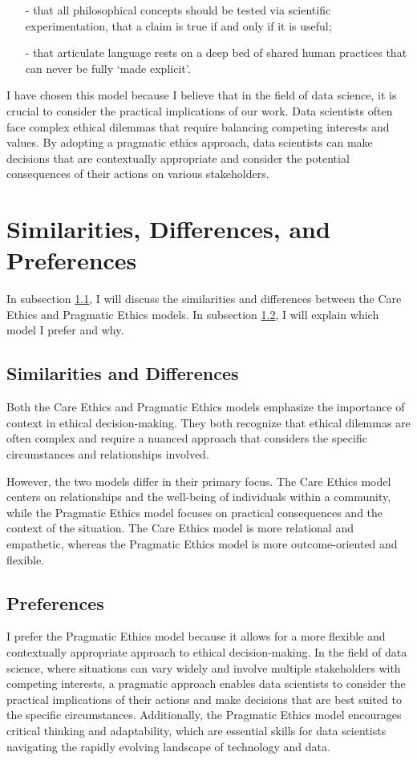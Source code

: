 \documentclass[11pt, twoside]{article}
\numberwithin{equation}{section}
\begin{document}
\begin{itemize}
    \item[-] that all philosophical concepts should be tested via scientific experimentation, that a claim is true if and only if it is useful;
    \item[-] that articulate language rests on a deep bed of shared human practices that can never be fully ‘made explicit’.
\end{itemize}

I have chosen this model because I believe that in the field of data science, it is crucial to consider the practical implications of our work. Data scientists often face complex ethical dilemmas that require balancing competing interests and values. By adopting a pragmatic ethics approach, data scientists can make decisions that are contextually appropriate and consider the potential consequences of their actions on various stakeholders.

\clearpage
\section{Similarities, Differences, and Preferences}
In subsection \ref{sub:similarities-and-differences}, I will discuss the similarities and differences between the Care Ethics and Pragmatic Ethics models. In subsection \ref{sub:preferences}, I will explain which model I prefer and why.

\subsection{Similarities and Differences}\label{sub:similarities-and-differences}
Both the Care Ethics and Pragmatic Ethics models emphasize the importance of context in ethical decision-making. They both recognize that ethical dilemmas are often complex and require a nuanced approach that considers the specific circumstances and relationships involved.

However, the two models differ in their primary focus. The Care Ethics model centers on relationships and the well-being of individuals within a community, while the Pragmatic Ethics model focuses on practical consequences and the context of the situation. The Care Ethics model is more relational and empathetic, whereas the Pragmatic Ethics model is more outcome-oriented and flexible.

\subsection{Preferences}\label{sub:preferences}
I prefer the Pragmatic Ethics model because it allows for a more flexible and contextually appropriate approach to ethical decision-making. In the field of data science, where situations can vary widely and involve multiple stakeholders with competing interests, a pragmatic approach enables data scientists to consider the practical implications of their actions and make decisions that are best suited to the specific circumstances. Additionally, the Pragmatic Ethics model encourages critical thinking and adaptability, which are essential skills for data scientists navigating the rapidly evolving landscape of technology and data.
\end{document}
